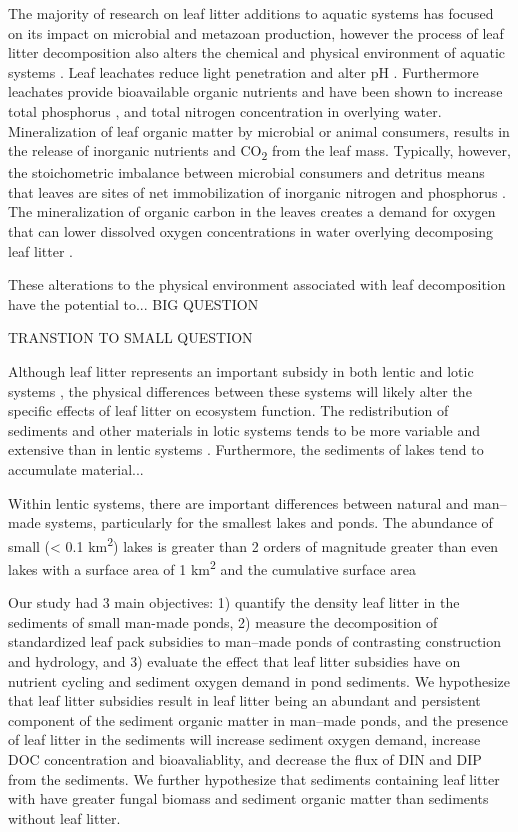 The majority of research on leaf litter additions to aquatic systems has focused on its impact on microbial and metazoan production, however the process of leaf litter decomposition also alters the chemical and physical environment of aquatic systems \cite{Gessner_1999}. Leaf leachates reduce light penetration \cite{CITE} and alter pH \cite{CITE}. Furthermore leachates provide bioavailable organic nutrients \cite{McConnell_1968,Duan_2014} and have been shown to increase total phosphorus \cite{Feh_2015b}, and total nitrogen \cite{Feh_2015} concentration in overlying water. Mineralization of leaf organic matter by microbial or animal consumers, results in the release of inorganic nutrients and CO\textsubscript{2} \cite{CITE} from the leaf mass. Typically, however, the stoichometric imbalance between microbial consumers and detritus means that leaves are sites of net immobilization of inorganic nitrogen and phosphorus \cite{CITE}. The mineralization of organic carbon in the leaves creates a demand for oxygen \cite{CITE} that can lower dissolved oxygen concentrations in water overlying decomposing leaf litter \cite{Hodkinson_1975,Rubbo_2008,Mehring_2014,Feh_2015b}.

These alterations to the physical environment associated with leaf decomposition have the potential to... BIG QUESTION

TRANSTION TO SMALL QUESTION

Although leaf litter represents an important subsidy in both lentic and lotic systems \cite{Webster_1986}, the physical differences between these systems will likely alter the specific effects of leaf litter on ecosystem function. The redistribution of sediments and other materials in lotic systems tends to be more variable and extensive than in lentic systems \cite{Wetzel_2001}. Furthermore, the sediments of lakes tend to accumulate material...

Within lentic systems, there are important differences between natural and man--made systems, particularly for the smallest lakes and ponds. The abundance of small (< 0.1 km\textsuperscript{2}) lakes is greater than 2 orders of magnitude greater than even lakes with a surface area of 1 km\textsuperscript{2} \cite{2010} and the cumulative surface area 

Our study had 3 main objectives: 1) quantify the density leaf litter in the sediments of small man-made ponds, 2) measure the decomposition of standardized leaf pack subsidies to man--made ponds of contrasting construction and hydrology, and 3) evaluate the effect that leaf litter subsidies have on nutrient cycling and sediment oxygen demand in pond sediments. We hypothesize that leaf litter subsidies result in leaf litter being an abundant and persistent component of the sediment organic matter in man--made ponds, and the presence of leaf litter in the sediments will increase sediment oxygen demand, increase DOC concentration and bioavaliablity, and decrease the flux of DIN and DIP from the sediments. We further hypothesize that sediments containing leaf litter with have greater fungal biomass and sediment organic matter than sediments without leaf litter.